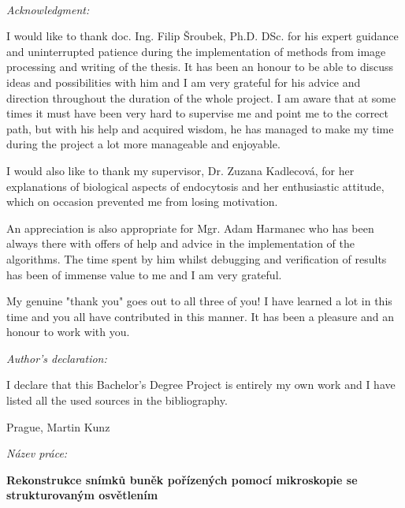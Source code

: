 ~

 

\noindent \emph{\Large{}Acknowledgment:}{\Large\par}

\noindent I would like to thank 
doc. Ing. Filip Šroubek, Ph.D. DSc. 
for his expert guidance and uninterrupted patience during the implementation of methods from image processing and
writing of the thesis.
It has been an honour to be able to discuss ideas and possibilities with him and I am very grateful for his advice and
    direction throughout the duration of the whole project.
I am aware that at some times it must have been very hard to supervise me and point me to the correct path, but with his
    help and acquired wisdom, he has managed to make my time during the project a lot more manageable and enjoyable.

I would also like to thank my supervisor, Dr. Zuzana Kadlecová, for her explanations of biological aspects of
    endocytosis and her enthusiastic attitude, which on occasion prevented me from losing motivation.

An appreciation is also appropriate for Mgr. Adam Harmanec who has been always there with offers of help and advice in
    the implementation of the algorithms.
The time spent by him whilst debugging and verification of results has been of immense value to me and I am very
    grateful.

My genuine "thank you" goes out to all three of you!
I have learned a lot in this time and you all have contributed in this manner. 
It has been a pleasure and an honour to work with you.

\vfill

\noindent \emph{\Large{}Author's declaration:}{\Large\par}

\noindent I declare that this Bachelor's Degree Project is entirely
my own work and I have listed all the used sources in the bibliography.

\bigskip{}

\noindent Prague, \documentdate\hfill{}Martin Kunz

\vspace{2cm}

\newpage{}


%
\begin{onehalfspace}
\noindent \emph{Název práce:}

\noindent \textbf{Rekonstrukce snímků buněk pořízených pomocí mikroskopie se strukturovaným osvětlením}
\end{onehalfspace}


